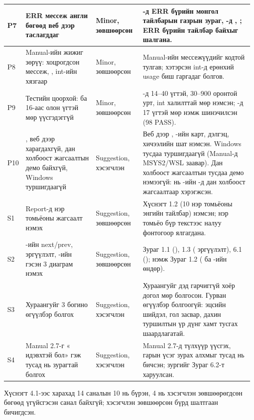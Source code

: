 {\begin{longtable}{|L{0.05\textwidth}|L{0.27\textwidth}|L{0.13\textwidth}|L{0.45\textwidth}|}
P7 & ERR мессеж англи бөгөөд веб дээр таслагддаг & Minor, зөвшөөрсөн & -д ERR бүрийн монгол тайлбарын газрын зураг, -д , ;  ERR бүрийн тайлбар байхыг шалгана. \\ \hline
P8 & Manual-ийн жижиг зөрүү: хоцрогдсон мессеж, , int-ийн хязгаар & Minor, зөвшөөрсөн & Manual-ийн мессежүүдийг кодтой тулгав; хэтэрсэн int-д ерөнхий usage биш  гаргадаг болгов. \\ \hline
P9 & Тестийн цоорхой:  ба  16-аас олон үгтэй мөр үүсгэдэггүй & Minor, зөвшөөрсөн & -д 14--40 үгтэй, 30--900 оронтой урт, int халилттай мөр нэмсэн; -д 17 үгтэй мөр нэмж  шинэчилсэн (98 PASS). \\ \hline
P10 & ,  веб дээр харагдахгүй, дан холбоост жагсаалтын демо байхгүй, Windows туршигдаагүй & Suggestion, хэсэгчлэн & Веб дээр , -ийн карт, дэлгэц, хичээлийн шат нэмсэн. Windows тусдаа туршигдаагүй (Manual-д MSYS2/WSL заавар). Дан холбоост жагсаалтын тусдаа демо нэмээгүй:  нь -ийн -д дан холбоост жагсаалтаар хэрэгжсэн. \\ \hline
S1 & Report-д нэр томьёоны жагсаалт нэмэх & Suggestion, зөвшөөрсөн & Хүснэгт 1.2 (10 нэр томьёоны энгийн тайлбар) нэмсэн; нэр томьёо бүр текстээс налуу фонтогоор ялгагдана. \\ \hline
S2 & -ийн next/prev,  эргүүлэлт, -ийн  гэсэн 3 диаграм нэмэх & Suggestion, зөвшөөрсөн & Зураг 1.1 (), 1.3 ( эргүүлэлт), 6.1 (); нэмж Зураг 1.2 ( ба -ийн өндөр). \\ \hline
S3 & Хураангуйг 3 богино өгүүлбэр болгох & Suggestion, хэсэгчлэн & Хураангуйг дэд гарчиггүй хоёр догол мөр болгосон. Гурван өгүүлбэр болгоогүй: эцсийн шийдэл, гол засвар, дахин туршилтын үр дүнг хамт тусгах шаардлагатай. \\ \hline
S4 & Manual 2.7-г « идэвхтэй бол» гэж тусад нь зурагтай болгох & Suggestion, хэсэгчлэн & Manual 2.7-д  түлхүүр үүсгэх, гарын үсэг зурах алхмыг тусад нь бичсэн; зургийг Зураг 6.2-т харуулсан. \\ \hline
\end{longtable}
\par}

Хүснэгт 4.1-ээс харахад 14 саналын 10 нь бүрэн, 4 нь хэсэгчлэн зөвшөөрөгдсөн бөгөөд үгүйсгэсэн санал байхгүй; хэсэгчлэн зөвшөөрсөн бүрд шалтгаан бичигдсэн.

